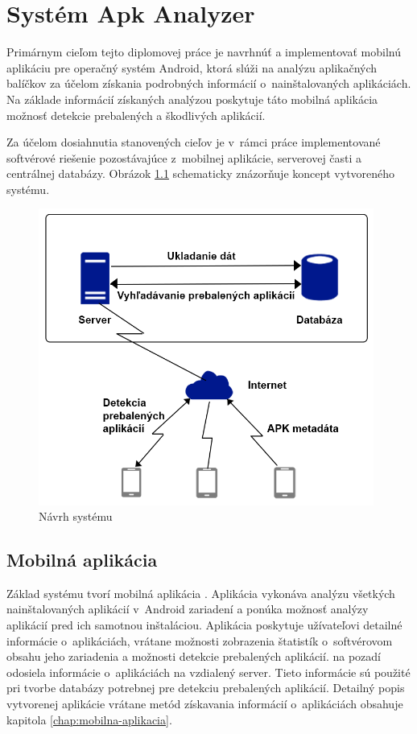 \chapter{Systém Apk Analyzer}
\label{chap:apk-analyzer}

Primárnym cieľom tejto diplomovej práce je navrhnúť a implementovať mobilnú aplikáciu pre operačný systém Android, ktorá slúži na analýzu aplikačných balíčkov za účelom získania podrobných informácií o~nainštalovaných aplikáciách. Na základe informácií získaných analýzou poskytuje táto mobilná aplikácia možnosť detekcie prebalených a škodlivých aplikácií. 

Za účelom dosiahnutia stanovených cieľov je v~rámci práce implementované softvérové riešenie pozostávajúce z~mobilnej aplikácie, serverovej časti a centrálnej databázy. Obrázok \ref{fig:systémApkAnalyzer} schematicky znázorňuje koncept vytvoreného systému.

\begin{figure}[htb]
  \begin{center}
    \includegraphics[width=110mm]{images/system-overview.png}
  \end{center}
  \caption{Návrh systému }
  \label{fig:systémApkAnalyzer}
\end{figure}

\section{Mobilná aplikácia}
Základ systému tvorí mobilná aplikácia . Aplikácia vykonáva analýzu všetkých nainštalovaných aplikácií v~Android zariadení a ponúka možnosť analýzy aplikácií pred ich samotnou inštaláciou. Aplikácia poskytuje užívateľovi detailné informácie o~aplikáciách, vrátane možnosti zobrazenia štatistík o~softvérovom obsahu jeho zariadenia a možnosti detekcie prebalených aplikácií.  na pozadí odosiela informácie o~aplikáciách na vzdialený server. Tieto informácie sú použité pri tvorbe databázy potrebnej pre detekciu prebalených aplikácií. Detailný popis vytvorenej aplikácie vrátane metód získavania informácií o~aplikáciách obsahuje kapitola \ref{chap:mobilna-aplikacia}.

